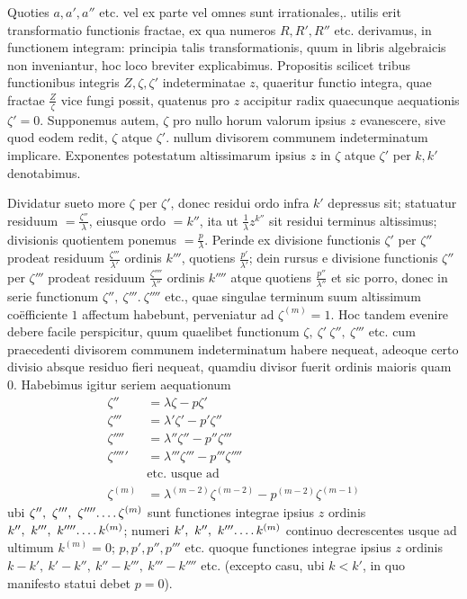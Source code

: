 Quoties $a, a', a''$ etc. vel ex parte vel omnes sunt irrationales,. utilis erit transformatio functionis fractae, ex qua numeros $R, R', R''$ etc. derivamus, in functionem integram: principia talis transformationis, quum in libris algebraicis non inveniantur, hoc loco breviter explicabimus. Propositis scilicet tribus functionibus integris $Z,\zeta,\zeta'$ indeterminatae $z$, quaeritur functio integra, quae fractae $\frac Z\zeta$ vice fungi possit, quatenus pro $z$ accipitur radix quaecunque aequationis $\zeta'=0$. Supponemus autem, $\zeta$ pro nullo horum valorum ipsius $z$ evanescere, sive quod eodem redit, $\zeta$ atque $\zeta'$. nullum divisorem communem indeterminatum implicare. Exponentes potestatum altissimarum ipsius $z$ in $\zeta$ atque $\zeta'$ per $k,k'$ denotabimus.

Dividatur sueto more $\zeta$ per $\zeta'$, donec residui ordo infra $k'$ depressus sit; statuatur residuum $=\frac{\zeta''}{\lambda}$, eiusque ordo $=k''$, ita ut $\frac1\lambda z^{k''}$ sit residui terminus altissimus; divisionis quotientem ponemus $=\frac p\lambda$. Perinde ex divisione functionis $\zeta'$ per $\zeta''$ prodeat residuum $\frac{\zeta'''}{\lambda'}$ ordinis $k'''$, quotiens $\frac{p'}{\lambda'}$; dein rursus e divisione functionis $\zeta''$ per $\zeta'''$ prodeat residuum $\frac{\zeta''''}{\lambda''}$ ordinis $k''''$ atque quotiens $\frac{p''}{\lambda''}$ et sic porro, donec in serie functionum $\zeta'',\ \zeta'''.\ \zeta''''$ etc., quae singulae terminum suum altissimum co\"efficiente $1$ affectum habebunt, perveniatur ad $\zeta^{(m)}=1$. Hoc tandem evenire debere facile perspicitur, quum quaelibet functionum $\zeta,\ \zeta'\ \zeta'',\ \zeta'''$ etc. cum praecedenti divisorem communem indeterminatum habere nequeat, adeoque certo divisio absque residuo fieri nequeat, quamdiu divisor fuerit ordinis maioris quam $0$. Habebimus igitur seriem aequationum
\[
\begin{aligned}
\zeta''&=\lambda\zeta-p\zeta'\\
\zeta'''&=\lambda'\zeta'-p'\zeta''\\
\zeta''''&=\lambda''\zeta''-p''\zeta'''\\
\zeta'''''&=\lambda'''\zeta'''-p'''\zeta''''\\
&\text{etc. usque ad}\\
\zeta^{(m)}&=\lambda^{(m-2)}\zeta^{(m-2)}-p^{(m-2)}\zeta^{(m-1)}
\end{aligned}
\]
ubi $\zeta'',\allowbreak \ \zeta''',\allowbreak \ \zeta''''\ldotp\ldotp\ldotp\ldotp\zeta^{(m)}$ sunt functiones integrae ipsius $z$ ordinis $k'',\allowbreak \ k''',\allowbreak \ k''''\ldotp\ldotp\ldotp\ldotp k^{(m)}$; numeri $k',\allowbreak \ k'',\allowbreak \ k'''\ldotp\ldotp\ldotp\ldotp k^{(m)}$ continuo decrescentes usque ad ultimum $k^{(m)}=0$; $p,\allowbreak p',\allowbreak p'',\allowbreak p'''$ etc. quoque functiones integrae ipsius $z$ ordinis $k-k',\allowbreak \ k'-k'',\allowbreak \ k''-k''',\allowbreak \ k'''-k''''$ etc. (excepto casu, ubi $k<k'$, in quo manifesto statui debet $p=0$).

